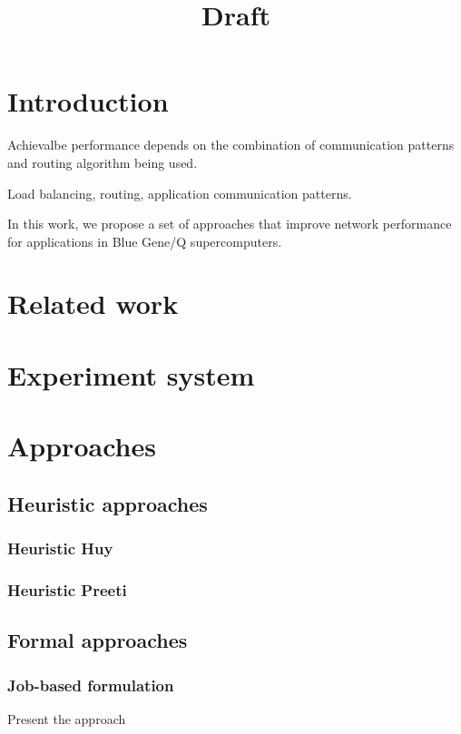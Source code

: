 \documentclass[letter]{article}
\title{Draft}
\begin{document}
\maketitle

\section{Introduction}
Achievalbe performance depends on the combination of communication patterns and routing algorithm being used.

Load balancing, routing, application communication patterns.

In this work, we propose a set of approaches that improve network performance for applications in Blue Gene/Q supercomputers. 

\section{Related work}

\section{Experiment system}

\section{Approaches}

\subsection{Heuristic approaches}

\subsubsection{Heuristic Huy}

\subsubsection{Heuristic Preeti}

\subsection{Formal approaches}

\subsubsection{Job-based formulation}
Present the approach
\end{document}
